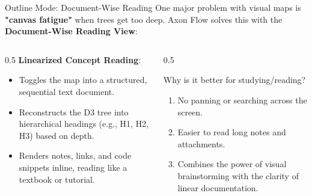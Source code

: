 \documentclass[aspectratio=169, 10pt]{beamer}
\begin{document}
\begin{frame}{Outline Mode: Document-Wise Reading}
  One major problem with visual maps is \textbf{"canvas fatigue"} when trees get too deep. Axon Flow solves this with the \textbf{Document-Wise Reading View}:
  \vspace{0.8em}
  \begin{columns}
    \begin{column}{0.5\textwidth}
      \textbf{Linearized Concept Reading}:
      \begin{itemize}
        \item[\textcolor{axonpurple}{\tiny$\blacksquare$}] Toggles the map into a structured, sequential text document.
        \item[\textcolor{axonpurple}{\tiny$\blacksquare$}] Reconstructs the D3 tree into hierarchical headings (e.g., H1, H2, H3) based on depth.
        \item[\textcolor{axonpurple}{\tiny$\blacksquare$}] Renders notes, links, and code snippets inline, reading like a textbook or tutorial.
      \end{itemize}
    \end{column}
    \begin{column}{0.5\textwidth}
      \begin{block}{Why is it better for studying/reading?}
        \begin{enumerate}
          \item No panning or searching across the screen.
          \item Easier to read long notes and attachments.
          \item Combines the power of visual brainstorming with the clarity of linear documentation.
        \end{enumerate}
      \end{block}
    \end{column}
  \end{columns}
\end{frame}
\end{document}
